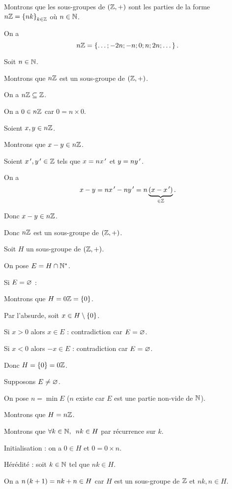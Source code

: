 \begin{dem}
Montrons que les sous-groupes de \(\groupe{\Z}\) sont les parties de la forme \(n\mathbb{Z}=\left\lbrace nk\right\rbrace_{k\in\mathbb{Z}}\) où \(n\in\mathbb{N}\).

On a \[n\mathbb{Z}=\left\lbrace\dots;-2n;-n;0;n;2n;\dots\right\rbrace.\]

\increc

Soit \(n\in\mathbb{N}\).

Montrons que \(n\mathbb{Z}\) est un sous-groupe de \(\groupe{\Z}\).

On a \(n\mathbb{Z}\subseteq\mathbb{Z}\).

On a \(0\in n\mathbb{Z}\) car \(0=n\times0\).

Soient \(x,y\in n\mathbb{Z}\).

Montrons que \(x-y\in n\mathbb{Z}\).

Soient \(x^{\,\prime},y^{\,\prime}\in\mathbb{Z}\) tels que \(x=nx^{\,\prime}\) et \(y=ny^{\,\prime}\).

On a \[x-y=nx^{\,\prime}-ny^{\,\prime}=n\underbrace{\left(x-x^{\,\prime}\right)}_{\in\mathbb{Z}}.\]

Donc \(x-y\in n\mathbb{Z}\).

Donc \(n\mathbb{Z}\) est un sous-groupe de \(\groupe{\Z}\).

\incdir

Soit \(H\) un sous-groupe de \(\groupe{\Z}\).

On pose \(E=H\cap\mathbb{N}^*\).

Si \(E=\varnothing\) :

Montrons que \(H=0\mathbb{Z}=\left\lbrace0\right\rbrace\).

Par l'absurde, soit \(x\in H\setminus\left\lbrace0\right\rbrace\).

Si \(x>0\) alors \(x\in E\) : contradiction car \(E=\varnothing\).

Si \(x<0\) alors \(-x\in E\) : contradiction car \(E=\varnothing\).

Donc \(H=\left\lbrace0\right\rbrace=0\mathbb{Z}\).

Supposons \(E\not=\varnothing\).

On pose \(n=\min E\) (\(n\) existe car \(E\) est une partie non-vide de \(\mathbb{N}\)).

Montrons que \(H=n\mathbb{Z}\).

\increc

Montrons que \(\quantifs{\forall k\in\N}nk\in H\) par récurrence sur \(k\).

Initialisation : on a \(0\in H\) et \(0=0\times n\).

Hérédité : soit \(k\in\mathbb{N}\) tel que \(nk\in H\).

On a \(n\left(k+1\right)=nk+n\in H\) car \(H\) est un sous-groupe de \(\mathbb{Z}\) et \(nk,n\in H\).


\end{dem}
